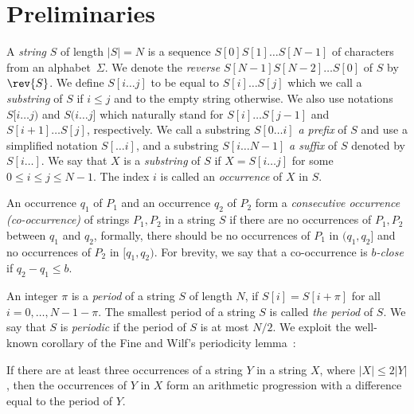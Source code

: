\section{Preliminaries}
\label{indexgapped:sec:prelim}
A \emph{string} $S$ of length $|S| = N$ is a sequence $S[0]S[1]\dots S[N-1]$ of characters from an alphabet~$\Sigma$. We denote the \emph{reverse} $S[N-1] S[N-2] \ldots S[0]$ of $S$ by $\rev{S}$. We define $S[i \dots j]$ to be equal to $S[i] \dots S[j]$ which we call a \emph{substring} of $S$ if $i \le j$ and to the empty string otherwise. We also use notations $S[i \dots j)$ and $S(i\dots j]$ which naturally stand for $S[i] \dots S[j-1]$ and $S[i+1] \dots S[j]$, respectively. 
We call a substring $S[0 \dots i]$ \emph{a prefix} of $S$ and use a simplified notation $S[\dots i]$, and a substring $S[i \dots N-1]$ \emph{a suffix} of $S$ denoted by $S[i \dots]$. We say that $X$ is a \emph{substring} of $S$ if $X = S[i \dots j]$ for some $0 \le i \le j \le N-1$. The index $i$ is called an \emph{occurrence} of $X$ in $S$. 

An occurrence $q_1$ of $P_1$ and an occurrence $q_2$ of $P_2$ form a  \emph{consecutive occurrence (co-occurrence)} of strings $P_1,P_2$ in a string $S$ if there are no occurrences of $P_1,P_2$ between $q_1$ and $q_2$, formally, there should be no occurrences of $P_1$ in $(q_1,q_2]$ and no occurrences of $P_2$ in $[q_1,q_2)$. For brevity, we say that a co-occurrence is \emph{$b$-close} if $q_2-q_1 \le b$.  
 
An integer $\pi$ is a \emph{period} of a string $S$ of length $N$, if $S[i]=S[i+\pi]$ for all $i=0,\dots, N-1-\pi$. The smallest period of a string $S$ is called \emph{the period} of $S$. We say that $S$ is \emph{periodic} if  the period of $S$ is at most $N/2$. We exploit the well-known corollary of the Fine and Wilf's periodicity lemma~\cite{Fine1965}:


\begin{corollary}\label{cor:arithmetic_progression}
If there are at least three occurrences of a string $Y$ in a string $X$, where $|X| \le 2|Y|$, then the occurrences of $Y$ in $X$ form an arithmetic progression with a difference equal to the period of $Y$. 
\end{corollary}


